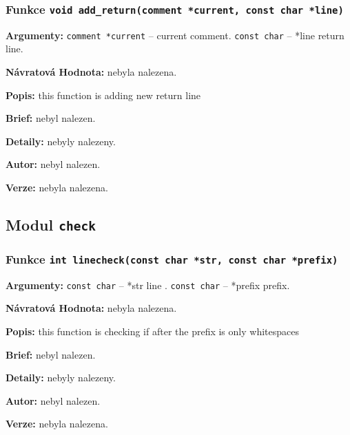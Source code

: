\documentclass[12pt, a4paper]{article}
\begin{document}
\subsubsection{Funkce \texttt{void add\_return(comment *current, const char *line)}}
\textbf{Argumenty: }\verb"comment *current" -- current comment. \verb"const char" -- *line return line. \\
\par\noindent
\textbf{Návratová Hodnota: }nebyla nalezena.\\
\par\noindent
\textbf{Popis: }this function is adding new return line\\
\par\noindent
\textbf{Brief: }nebyl nalezen.\\
\par\noindent
\textbf{Detaily: }nebyly nalezeny.\\
\par\noindent
\textbf{Autor: }nebyl nalezen.\\
\par\noindent
\textbf{Verze: }nebyla nalezena.\\
\par\noindent
\subsection{Modul \texttt{check}}
\subsubsection{Funkce \texttt{int linecheck(const char *str, const char *prefix)}}
\textbf{Argumenty: }\verb"const char" -- *str line . \verb"const char" -- *prefix prefix. \\
\par\noindent
\textbf{Návratová Hodnota: }nebyla nalezena.\\
\par\noindent
\textbf{Popis: }this function is checking if after the prefix is only whitespaces\\
\par\noindent
\textbf{Brief: }nebyl nalezen.\\
\par\noindent
\textbf{Detaily: }nebyly nalezeny.\\
\par\noindent
\textbf{Autor: }nebyl nalezen.\\
\par\noindent
\textbf{Verze: }nebyla nalezena.\\
\par\noindent
\end{document}
